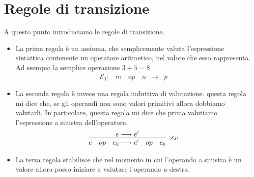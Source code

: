 \documentclass[oneside,a4paper,11pt]{book}
\theoremstyle{italicstyle}
\theoremstyle{normStyle}
\begin{document}
\section{Regole di transizione}
A questo punto introduciamo le regole di transizione.
\begin{itemize}
  \item La prima regola è un assioma, che semplicemente valuta l'espressione sintattica 
  contenente un operatore aritmetico, nel valore che esso rappresenta. Ad esempio la semplice operazione $3+5 = 8$
  \[
    \begin{matrix}
      \mathcal{E}_1: & m \quad op\quad n &\rightarrow &p
    \end{matrix}
  \]
  \item La seconda regola è invece una regola induttiva di valutazione. questa 
  regola mi dice che, se gli operandi non 
  sono valori primitivi allora dobbiamo valutarli. In particolare, questa regola 
  mi dice che prima valutiamo l'espressione a sinistra dell'operatore. 
  \[
  \infer[\scriptscriptstyle (\mathcal{E}_2)]
  {
    e \quad op \quad e_0 \longrightarrow e' \quad op \quad e_0
  }
  {
    e \longrightarrow e'
  }
  \]
\item La terza regola stabilisce che nel momento in cui l'operando a sinistra è un valore allora 
posso iniziare a valutare l'operando a destra.


\end{itemize}
\end{document}
